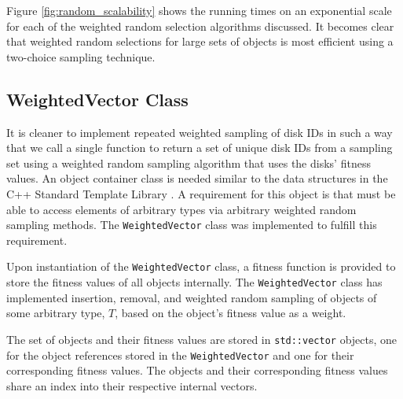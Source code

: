 \documentclass[12pt]{article}
\begin{document}
    Figure \ref{fig:random_scalability} shows the running times on an
    exponential scale for each of the weighted random selection algorithms
    discussed. It becomes clear that weighted random selections for large sets
    of objects is most efficient using a two-choice sampling technique.

  \subsection{WeightedVector Class}

  It is cleaner to implement repeated weighted sampling of disk IDs in such a
  way that we call a single function to return a set of unique disk IDs from a
  sampling set using a weighted random sampling algorithm that uses the disks'
  fitness values. An object container class is needed similar to the data
  structures in the C++ Standard Template Library \cite{stl}. A requirement for
  this object is that must be able to access elements of arbitrary types via
  arbitrary weighted random sampling methods. The \texttt{WeightedVector} class
  was implemented to fulfill this requirement. 

  Upon instantiation of the \texttt{WeightedVector} class, a fitness function
  is provided to store the fitness values of all objects internally. The
  \texttt{WeightedVector} class has implemented insertion, removal, and
  weighted random sampling of objects of some arbitrary type, $T$, based on the
  object's fitness value as a weight.

  The set of objects and their fitness values are stored in
  \texttt{std::vector} objects, one for the object references stored in the
  \texttt{WeightedVector} and one for their corresponding fitness values. The
  objects and their corresponding fitness values share an index into their
  respective internal vectors.
\end{document}
